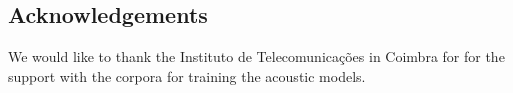 \documentclass[twocolumn]{bmcart}%
\begin{document}
\begin{backmatter}

\section*{Acknowledgements}
  We would like to thank the Instituto de Telecomunica\c{c}\~oes in Coimbra for
  for the support with the corpora for training the acoustic models.












\end{backmatter}
\end{document}
